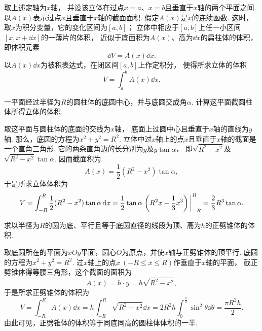 取上述定轴为\(x\)轴，
并设该立体在过点\(x=a\)、\(x=b\)且垂直于\(x\)轴的两个平面之间.
以\(A(x)\)表示过点\(x\)且垂直于\(x\)轴的截面面积.
假定\(A(x)\)是\(x\)的连续函数.
这时，取\(x\)为积分变量，它的变化区间为\([a,b]\)；
立体中相应于\([a,b]\)上任一小区间\([x,x+\dd{x}]\)的一薄片的体积，
近似于底面积为\(A(x)\)、高为\(\dd{x}\)的扁柱体的体积，
即体积元素\[
	\dd{V} = A(x) \dd{x}.
\]
以\(A(x) \dd{x}\)为被积表达式，在闭区间\([a,b]\)上作定积分，
便得所求立体的体积\[
	V = \int_a^b A(x) \dd{x}.
\]

\begin{example}
一平面经过半径为\(R\)的圆柱体的底圆中心，并与底圆交成角\(\alpha\).
计算这平面截圆柱体所得立体的体积.
\begin{solution}
取这平面与圆柱体的底面的交线为\(x\)轴，
底面上过圆中心且垂直于\(x\)轴的直线为\(y\)轴.
那么，底圆的方程为\(x^2+y^2=R^2\).
立体中过\(x\)轴上的点\(x\)且垂直于\(x\)轴的截面是一个直角三角形.
它的两条直角边的长分别为\(y\)及\(y \tan\alpha\)，
即\(\sqrt{R^2-x^2}\)及\(\sqrt{R^2-x^2} \tan\alpha\).
因而截面积为\[
	A(x) = \frac12 (R^2-x^2) \tan\alpha,
\]
于是所求立体体积为\[
	V = \int_{-R}^R \frac12 (R^2-x^2) \tan\alpha \dd{x}
	= \frac12 \tan\alpha \eval{\left(R^2x-\frac13x^3\right)}_{-R}^R
	= \frac23 R^3 \tan\alpha.
\]
\end{solution}
\end{example}

\begin{example}
求以半径为\(R\)的圆为底、平行且等于底圆直径的线段为顶、高为\(h\)的正劈锥体的体积.
\begin{solution}
取底圆所在的平面为\(xOy\)平面，圆心\(O\)为原点，并使\(x\)轴与正劈锥体的顶平行.
底圆的方程为\(x^2+y^2=R^2\).
过\(x\)轴上的点\(x\ (-R \leq x \leq R)\)作垂直于\(x\)轴的平面，
截正劈锥体得等腰三角形，这个截面的面积为\[
	A(x) = h \cdot y = h \sqrt{R^2-x^2},
\]
于是所求正劈锥体的体积为\[
	V = \int_{-R}^R A(x) \dd{x}
	= h \int_{-R}^R \sqrt{R^2-x^2} \dd{x}
	= 2 R^2 h \int_0^{\frac\pi2} \sin^2\theta \dd{\theta}
	= \frac{\pi R^2 h}2.
\]
由此可见，正劈锥体的体积等于同底同高的圆柱体体积的一半.
\end{solution}
\end{example}

